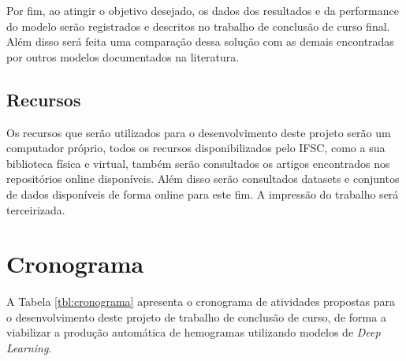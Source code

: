 Por fim, ao atingir o objetivo desejado, os dados dos resultados e da performance do modelo serão registrados e descritos no trabalho de conclusão de curso final. Além disso será feita uma comparação dessa solução com as demais encontradas por outros modelos documentados na literatura.

\section{Recursos}
\label{chap:recursos}

Os recursos que serão utilizados para o desenvolvimento deste projeto serão um computador próprio, todos os recursos disponibilizados pelo IFSC, como a sua biblioteca física e virtual, também serão consultados os artigos encontrados nos repositórios online disponíveis. Além disso serão consultados datasets e conjuntos de dados disponíveis de forma online para este fim. A impressão do trabalho será terceirizada.

\chapter{Cronograma}
\label{chap:cronograma}

A Tabela \ref{tbl:cronograma} apresenta o cronograma de atividades propostas para o desenvolvimento deste projeto de trabalho de conclusão de curso, de forma a viabilizar a produção automática de hemogramas utilizando modelos de \emph{Deep Learning}.


